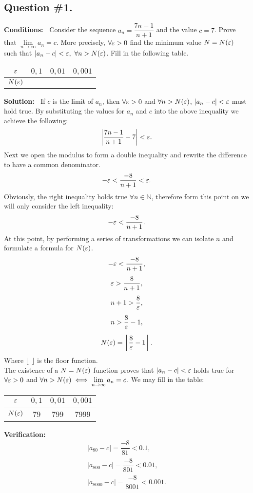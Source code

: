 \subsection*{\center Question \#1.}
{\bf Conditions:~}
Consider the sequence $a_n=\dfrac{7n-1}{n+1}$ and the value $c=7$. 
Prove that $\lim\limits_{n\rightarrow\infty}a_n=c$. 
More precisely, $\forall\varepsilon>0$ find the minimum value $N=N(\varepsilon)$ such that $\left|a_n-c\right|<\varepsilon,\ \forall n>N(\varepsilon)$.
Fill in the following table.
\begin{center}
	\begin{tabular}{|c|c|c|c|}
		\hline
		$\varepsilon$ &  $0{,}1$ & $0{,}01$ & $0{,}001$ \\
		\hline
		$N(\varepsilon)$ & & & \\
		\hline
	\end{tabular}
\end{center}
{\bf Solution:~}
If $c$ is the limit of $a_n$, then $\forall\varepsilon>0$ and $\forall n>N(\varepsilon)$, $\left|a_n-c\right|<\varepsilon$ must hold true.
By substituting the values for $a_n$ and $c$ into the above inequality we achieve the following:
$$\left|\dfrac{7n-1}{n+1}-7\right|<\varepsilon.$$
Next we open the modulus to form a double inequality and rewrite the difference to have a common denominator.
$$-\varepsilon<\dfrac{-8}{n+1}<\varepsilon.$$
Obviously, the right inequality holds true $\forall n \in \mathbb{N}$, therefore form this point on we will only consider the left inequality:
$$-\varepsilon<\dfrac{-8}{n+1}.$$
At this point, by performing a series of transformations we can isolate $n$ and formulate a formula for $N(\varepsilon)$.
$$
\begin{array}{c}
-\varepsilon<\dfrac{-8}{n+1},\\ [12pt]
\varepsilon>\dfrac{8}{n+1},\\ [12pt]
n+1>\dfrac{8}{\varepsilon},\\ [12pt]
n>\dfrac{8}{\varepsilon}-1,\\ [12pt]
N(\varepsilon)=\left\lfloor\dfrac{8}{\varepsilon}-1\right\rfloor.
\end{array}
$$
Where $\lfloor\ \ \rfloor$ {} is the floor function.\\
The existence of a $N=N(\varepsilon)$ function proves that $\left|a_n-c\right|<\varepsilon$ holds true for $\forall\varepsilon>0$ and $\forall n>N(\varepsilon) \iff \lim\limits_{n\rightarrow\infty}a_n=c$. We may fill in the table:
\begin{center}
	\begin{tabular}{|c|c|c|c|}
		\hline
		$\varepsilon$ &  $0{,}1$ & $0{,}01$ & $0{,}001$ \\
		\hline
		$N(\varepsilon)$ & 79 & 799  &  7999 \\
		\hline
	\end{tabular}
\end{center}
{\bf Verification:}
$$
\begin{array}{l}
\left|a_{80}-c\right|=\dfrac{-8}{81}<0.1,  \\[12pt]
\left|a_{800}-c\right|=\dfrac{-8}{801}<0.01,  \\[12pt]
\left|a_{8000}-c\right|=\dfrac{-8}{8001}<0.001.
\end{array}
$$

